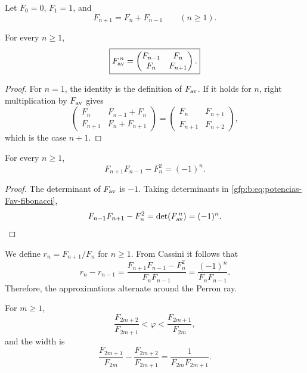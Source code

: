 Let \(F_0=0\), \(F_1=1\), and
\[
 F_{n+1}=F_n+F_{n-1}\qquad(n\geq1).
\]

\begin{theorem}
\label{gfp:b:thm:potencias-fibonacci-phi}
For every \(n\geq1\),
\begin{equation}
 \boxed{
 F_{\rm av}^{\,n}=
 \begin{pmatrix}
 F_{n-1}&F_n\\
 F_n&F_{n+1}
 \end{pmatrix}.}
 \label{gfp:b:eq:potencias-Fav-fibonacci}
\end{equation}
\end{theorem}

\begin{proof}
For \(n=1\), the identity is the definition of \(F_{\rm av}\). If it holds for \(n\), right multiplication by \(F_{\rm av}\) gives
\[
 \begin{pmatrix}
 F_n&F_{n-1}+F_n\\
 F_{n+1}&F_n+F_{n+1}
 \end{pmatrix}
 =
 \begin{pmatrix}
 F_n&F_{n+1}\\
 F_{n+1}&F_{n+2}
 \end{pmatrix},
\]
which is the case \(n+1\).
\end{proof}

\begin{theorem}
\label{gfp:b:thm:cassini-phi}
For every \(n\geq1\),
\begin{equation}
 \boxed{F_{n+1}F_{n-1}-F_n^2=(-1)^n.}
 \label{gfp:b:eq:cassini-phi}
\end{equation}
\end{theorem}

\begin{proof}
The determinant of \(F_{\rm av}\) is \(-1\). Taking determinants in
\eqref{gfp:b:eq:potencias-Fav-fibonacci},
\[
 F_{n-1}F_{n+1}-F_n^2
 =\det(F_{\rm av}^{\,n})=(-1)^n.
\]
\end{proof}

We define \(r_n=F_{n+1}/F_n\) for \(n\geq1\). From Cassini it follows that
\[
 r_n-r_{n-1}
 =\frac{F_{n+1}F_{n-1}-F_n^2}{F_nF_{n-1}}
 =\frac{(-1)^n}{F_nF_{n-1}}.
\]
Therefore, the approximations alternate around the Perron ray.

\begin{proposition}
\label{gfp:b:prop:horquillas-perron-phi}
For \(m\geq1\),
\begin{equation}
 \frac{F_{2m+2}}{F_{2m+1}}
 <\varphi<
 \frac{F_{2m+1}}{F_{2m}},
 \label{gfp:b:eq:horquilla-fibonacci-phi}
\end{equation}
and the width is
\begin{equation}
 \boxed{
 \frac{F_{2m+1}}{F_{2m}}
 -\frac{F_{2m+2}}{F_{2m+1}}
 =\frac{1}{F_{2m}F_{2m+1}}.}
 \label{gfp:b:eq:anchura-fibonacci-phi}
\end{equation}
\end{proposition}

